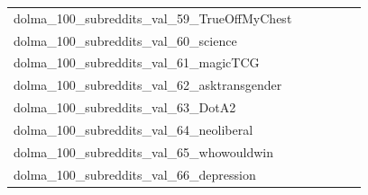 \documentclass[dvipsnames]{article}
\begin{document}
\begin{appendix}
{\begin{longtable}{m{6cm}m{1.7cm}m{1.7cm}m{1.7cm}m{1.7cm}m{1.7cm}}
	dolma\_100\_subreddits\_val\_59\_TrueOffMyChest  & \colorbox[HTML]{ffffe5}{\makebox[\mywidth][c]{21.53}} & \colorbox[HTML]{bbe395}{\makebox[\mywidth][c]{20.63}} & \colorbox[HTML]{ffffe5}{\makebox[\mywidth][c]{21.70}} & \colorbox[HTML]{e4f4ab}{\makebox[\mywidth][c]{20.73}} & \colorbox[HTML]{77c578}{\makebox[\mywidth][c]{20.54}}\\
	dolma\_100\_subreddits\_val\_60\_science  & \colorbox[HTML]{ffffe5}{\makebox[\mywidth][c]{20.44}} & \colorbox[HTML]{b3df91}{\makebox[\mywidth][c]{19.46}} & \colorbox[HTML]{ffffe5}{\makebox[\mywidth][c]{20.64}} & \colorbox[HTML]{c9e99b}{\makebox[\mywidth][c]{19.51}} & \colorbox[HTML]{77c578}{\makebox[\mywidth][c]{19.38}}\\
	dolma\_100\_subreddits\_val\_61\_magicTCG  & \colorbox[HTML]{ffffe5}{\makebox[\mywidth][c]{28.82}} & \colorbox[HTML]{e3f4aa}{\makebox[\mywidth][c]{26.79}} & \colorbox[HTML]{ffffe5}{\makebox[\mywidth][c]{28.94}} & \colorbox[HTML]{d5eea1}{\makebox[\mywidth][c]{26.69}} & \colorbox[HTML]{77c578}{\makebox[\mywidth][c]{26.38}}\\
	dolma\_100\_subreddits\_val\_62\_asktransgender  & \colorbox[HTML]{ffffe5}{\makebox[\mywidth][c]{20.72}} & \colorbox[HTML]{e5f4ab}{\makebox[\mywidth][c]{19.86}} & \colorbox[HTML]{ffffe5}{\makebox[\mywidth][c]{21.07}} & \colorbox[HTML]{def2a6}{\makebox[\mywidth][c]{19.83}} & \colorbox[HTML]{77c578}{\makebox[\mywidth][c]{19.62}}\\
	dolma\_100\_subreddits\_val\_63\_DotA2  & \colorbox[HTML]{ffffe5}{\makebox[\mywidth][c]{34.35}} & \colorbox[HTML]{bee496}{\makebox[\mywidth][c]{32.38}} & \colorbox[HTML]{ffffe5}{\makebox[\mywidth][c]{34.74}} & \colorbox[HTML]{e2f3a9}{\makebox[\mywidth][c]{32.57}} & \colorbox[HTML]{77c578}{\makebox[\mywidth][c]{32.16}}\\
	dolma\_100\_subreddits\_val\_64\_neoliberal  & \colorbox[HTML]{ffffe5}{\makebox[\mywidth][c]{21.74}} & \colorbox[HTML]{bae294}{\makebox[\mywidth][c]{20.59}} & \colorbox[HTML]{ffffe5}{\makebox[\mywidth][c]{22.26}} & \colorbox[HTML]{ccea9c}{\makebox[\mywidth][c]{20.64}} & \colorbox[HTML]{77c578}{\makebox[\mywidth][c]{20.45}}\\
	dolma\_100\_subreddits\_val\_65\_whowouldwin  & \colorbox[HTML]{ffffe5}{\makebox[\mywidth][c]{29.18}} & \colorbox[HTML]{e8f6ae}{\makebox[\mywidth][c]{27.81}} & \colorbox[HTML]{ffffe5}{\makebox[\mywidth][c]{30.08}} & \colorbox[HTML]{d3eda0}{\makebox[\mywidth][c]{27.63}} & \colorbox[HTML]{77c578}{\makebox[\mywidth][c]{27.30}}\\
	dolma\_100\_subreddits\_val\_66\_depression  & \colorbox[HTML]{ffffe5}{\makebox[\mywidth][c]{18.28}} & \colorbox[HTML]{d7efa2}{\makebox[\mywidth][c]{17.52}} & \colorbox[HTML]{ffffe5}{\makebox[\mywidth][c]{18.31}} & \colorbox[HTML]{c9e99b}{\makebox[\mywidth][c]{17.50}} & \colorbox[HTML]{77c578}{\makebox[\mywidth][c]{17.41}}\\

\end{longtable}}
\end{appendix}
\end{document}
